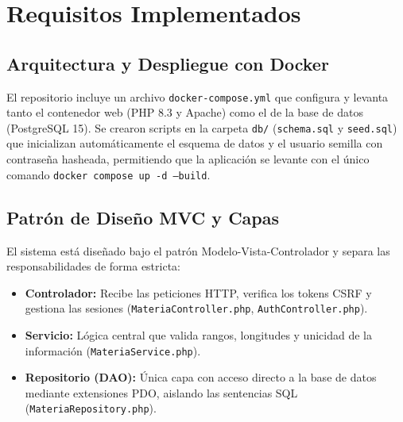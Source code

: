 \documentclass[12pt]{article}
\begin{document}
\section{Requisitos Implementados}

\subsection{Arquitectura y Despliegue con Docker}
El repositorio incluye un archivo \texttt{docker-compose.yml} que configura y levanta tanto el contenedor web (PHP 8.3 y Apache) como el de la base de datos (PostgreSQL 15). Se crearon scripts en la carpeta \texttt{db/} (\texttt{schema.sql} y \texttt{seed.sql}) que inicializan automáticamente el esquema de datos y el usuario semilla con contraseña hasheada, permitiendo que la aplicación se levante con el único comando \texttt{docker compose up -d --build}.

\subsection{Patrón de Diseño MVC y Capas}
El sistema está diseñado bajo el patrón Modelo-Vista-Controlador y separa las responsabilidades de forma estricta:
\begin{itemize}
    \item \textbf{Controlador:} Recibe las peticiones HTTP, verifica los tokens CSRF y gestiona las sesiones (\texttt{MateriaController.php}, \texttt{AuthController.php}).
    \item \textbf{Servicio:} Lógica central que valida rangos, longitudes y unicidad de la información (\texttt{MateriaService.php}).
    \item \textbf{Repositorio (DAO):} Única capa con acceso directo a la base de datos mediante extensiones PDO, aislando las sentencias SQL (\texttt{MateriaRepository.php}).
\end{itemize}
\end{document}
